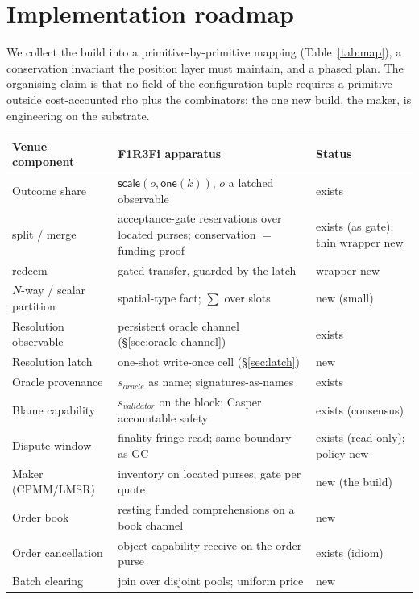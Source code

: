 \documentclass[11pt]{article}
\begin{document}
\section{Implementation roadmap}\label{sec:impl}

We collect the build into a primitive-by-primitive mapping (Table~\ref{tab:map}), a conservation
invariant the position layer must maintain, and a phased plan. The organising claim is that no
field of the configuration tuple requires a primitive outside cost-accounted rho plus the
combinators; the one new build, the maker, is engineering on the substrate.

\begin{table}[h]
\centering\small
\begin{tabular}{@{}p{3.5cm}p{5.3cm}p{4.4cm}@{}}
\toprule
\textbf{Venue component} & \textbf{F1R3Fi apparatus} & \textbf{Status} \\
\midrule
Outcome share & $\textsf{scale}(o,\textsf{one}(k))$, $o$ a latched observable & exists \\
\textsf{split} / \textsf{merge} & acceptance-gate reservations over located purses; conservation $=$ funding proof & exists (as gate); thin wrapper new \\
\textsf{redeem} & gated transfer, guarded by the latch & wrapper new \\
$N$-way / scalar partition & spatial-type fact; $\sum$ over slots & new (small) \\
Resolution observable & persistent oracle channel (\S\ref{sec:oracle-channel}) & exists \\
Resolution latch & one-shot write-once cell (\S\ref{sec:latch}) & new \\
Oracle provenance & $s_{\mathit{oracle}}$ as name; signatures-as-names & exists \\
Blame capability & $s_{\mathit{validator}}$ on the block; Casper accountable safety & exists (consensus) \\
Dispute window & finality-fringe read; same boundary as GC & exists (read-only); policy new \\
Maker (CPMM/LMSR) & inventory on located purses; gate per quote & new (the build) \\
Order book & resting funded comprehensions on a book channel & new \\
Order cancellation & object-capability receive on the order purse & exists (idiom) \\
Batch clearing & join over disjoint pools; uniform price & new \\

\end{tabular}
\end{table}
\end{document}
